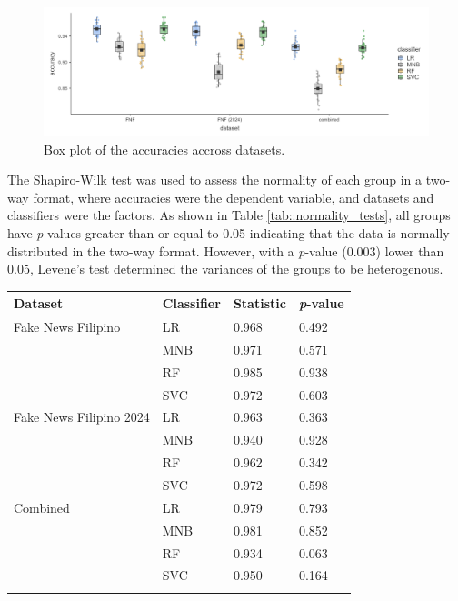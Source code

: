 \begin{figure}[h!]
    \centering
    \includegraphics[width=\textwidth,height=\textheight, keepaspectratio]{figures/stats/box_plot.png}
        \caption{Box plot of the accuracies accross datasets.}
        \label{fig:box_plot_accuracy}
\end{figure}

The Shapiro-Wilk test was used to assess the normality of each group in a two-way format, where accuracies were the dependent variable, and datasets and classifiers were the factors. As shown in Table \ref{tab::normality_tests}, all groups have \textit{p}-values greater than or equal to 0.05 indicating that the data is normally distributed in the two-way format. However, with a \textit{p}-value (0.003) lower than 0.05, Levene's test determined the variances of the groups to be heterogenous.

\singlespacing
\begin{tabularx}{\textwidth}{|l|l|l|l|}
    \hline
    Dataset & Classifier & Statistic & \textit{p}-value \\
    \hline
    Fake News Filipino & LR & 0.968 & 0.492 \\
    \cline{2-4}
    & MNB & 0.971 & 0.571 \\
    \cline{2-4}
    & RF & 0.985 & 0.938 \\
    \cline{2-4}
    & SVC & 0.972 & 0.603 \\
    \hline
    Fake News Filipino 2024 & LR & 0.963 & 0.363 \\
    \cline{2-4}
    & MNB & 0.940 & 0.928 \\
    \cline{2-4}
    & RF & 0.962 & 0.342 \\
    \cline{2-4}
    & SVC & 0.972 & 0.598 \\
    \hline
    Combined & LR & 0.979 & 0.793 \\
    \cline{2-4}
    & MNB & 0.981 & 0.852 \\
    \cline{2-4}
    & RF & 0.934 & 0.063 \\
    \cline{2-4}
    & SVC & 0.950 & 0.164 \\
    \hline
\caption{Shapiro-Wilk normality test in a two-way format.}
\label{tab::normality_tests}
\end{tabularx}
\doublespacing

